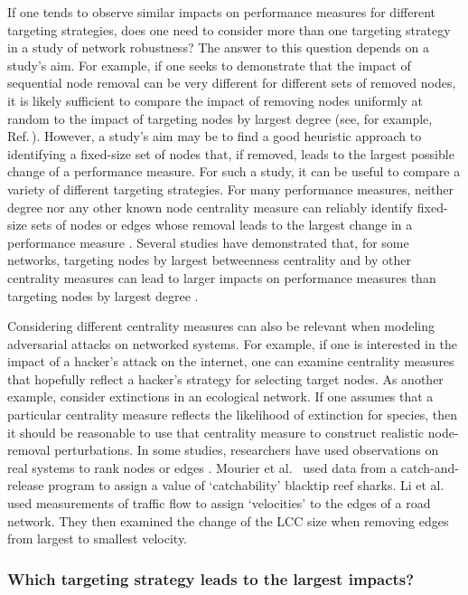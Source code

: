 \documentclass{comnet-mod}
\begin{document}
If one tends to observe similar impacts on performance measures for different targeting strategies, does one need to consider more than one targeting strategy in a study of network robustness? The answer to this question depends on a study's aim. For example, if one seeks to demonstrate that the impact of sequential node removal can be very different for different sets of removed nodes, it is likely sufficient to compare the impact of removing nodes uniformly at random to the impact of targeting nodes by largest degree (see, for example, Ref.\,\cite{Albert2000}). However, a study's aim may be to find a good heuristic approach to identifying a fixed-size set of nodes that, if removed, leads to the largest possible change of a performance measure. For such a study, it can be useful to compare a variety of different targeting strategies. For many performance measures, neither degree nor any other known node centrality measure can reliably identify fixed-size sets of nodes or edges whose removal leads to the largest change in a performance measure \cite{Braunstein2016}. Several studies have demonstrated that, for some networks, targeting nodes by largest betweenness centrality and by other centrality measures can lead to larger impacts on performance measures than targeting nodes by largest degree \cite{Holme2002, Iyer2013, Lordan2014, Ventresca2014}. 

Considering different centrality measures can also be relevant when modeling adversarial attacks on networked systems. For example, if one is interested in the impact of a hacker's attack on the internet, one can examine centrality measures that hopefully reflect a hacker's strategy for selecting target nodes. As another example, consider extinctions in an ecological network. If one assumes that a particular centrality measure reflects the likelihood of extinction for 
species, then it should be reasonable to use that centrality measure to construct realistic node-removal perturbations. In some studies, researchers have used observations on real systems to rank nodes or edges \cite{Li2015, Mourier2017}. Mourier et al.~\cite{Mourier2017} used data from a catch-and-release program to assign a value of `catchability' blacktip reef sharks. Li et al.~\cite{Li2015a} used measurements of traffic flow to assign `velocities' to the edges of a road network. They then examined the change of the LCC size when removing edges from largest to smallest velocity.



\subsubsection{Which targeting strategy leads to the largest impacts?}
\end{document}

